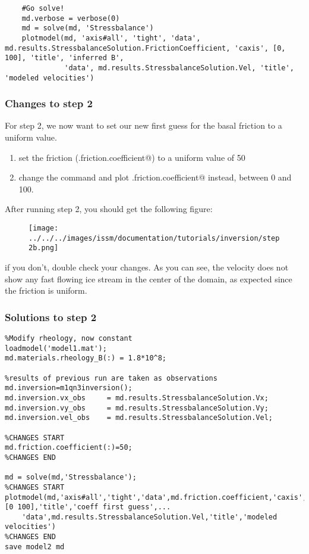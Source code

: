 \begin{verbatim}
    #Go solve!
    md.verbose = verbose(0)
    md = solve(md, 'Stressbalance')
    plotmodel(md, 'axis#all', 'tight', 'data', md.results.StressbalanceSolution.FrictionCoefficient, 'caxis', [0, 100], 'title', 'inferred B',
              'data', md.results.StressbalanceSolution.Vel, 'title', 'modeled velocities')
\end{verbatim}

\subsubsection{Changes to step 2}
For step 2, we now want to set our new first guess for the basal friction to a uniform value.
\begin{enumerate}
	\item set the friction (\verb@md.friction.coefficient@) to a uniform value of 50
	\item change the \verb@plotmodel@ command and plot \verb@md.friction.coefficient@ instead, between 0 and 100.
\end{enumerate}
After running step 2, you should get the following figure:
\begin{figure}[H]
	\begin{center}
		\texttt{[image: ../../../images/issm/documentation/tutorials/inversion/step2b.png]}
	\end{center}
\end{figure}
if you don't, double check your changes. As you can see, the velocity does not show any fast flowing ice stream in the center of the domain, as expected since the friction is uniform.

\subsubsection{Solutions to step 2}
\begin{verbatim}%Modify rheology, now constant
loadmodel('model1.mat');
md.materials.rheology_B(:) = 1.8*10^8;

%results of previous run are taken as observations
md.inversion=m1qn3inversion();
md.inversion.vx_obs		= md.results.StressbalanceSolution.Vx;
md.inversion.vy_obs		= md.results.StressbalanceSolution.Vy;
md.inversion.vel_obs	= md.results.StressbalanceSolution.Vel;

%CHANGES START
md.friction.coefficient(:)=50;
%CHANGES END

md = solve(md,'Stressbalance');
%CHANGES START
plotmodel(md,'axis#all','tight','data',md.friction.coefficient,'caxis',[0 100],'title','coeff first guess',...
	'data',md.results.StressbalanceSolution.Vel,'title','modeled velocities')
%CHANGES END
save model2 md\end{verbatim}

